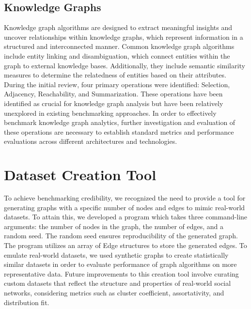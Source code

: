 \documentclass[letterpaper, 10pt]{article}
\begin{document}
\begin{multicols}{2}
        \subsection{Knowledge Graphs}
            Knowledge graph algorithms are designed to extract meaningful insights and uncover relationships within knowledge graphs, which represent information in a structured and interconnected manner. Common knowledge graph algorithms include entity linking and disambiguation, which connect entities within the graph to external knowledge bases. Additionally, they include semantic similarity measures to determine the relatedness of entities based on their attributes. During the initial review, four primary operations were identified: Selection, Adjacency, Reachability, and Summarization. These operations have been identified as crucial for knowledge graph analysis but have been relatively unexplored in existing benchmarking approaches. In order to effectively benchmark knowledge graph analytics, further investigation and evaluation of these operations are necessary to establish standard metrics and performance evaluations across different architectures and technologies.
            
    \section{Dataset Creation Tool}
        To achieve benchmarking credibility, we recognized the need to provide a tool for generating graphs with a specific number of nodes and edges to mimic real-world datasets. To attain this, we developed a program which takes three command-line arguments: the number of nodes in the graph, the number of edges, and a random seed. The random seed ensures reproducibility of the generated graph. The program utilizes an array of Edge structures to store the generated edges. To emulate real-world datasets, we used synthetic graphs to create statistically similar datasets in order to evaluate performance of graph algorithms on more representative data. Future improvements to this creation tool involve curating custom datasets that reflect the structure and properties of real-world social networks, considering metrics such as cluster coefficient, assortativity, and distribution fit. 
        

\end{multicols}
\end{document}
